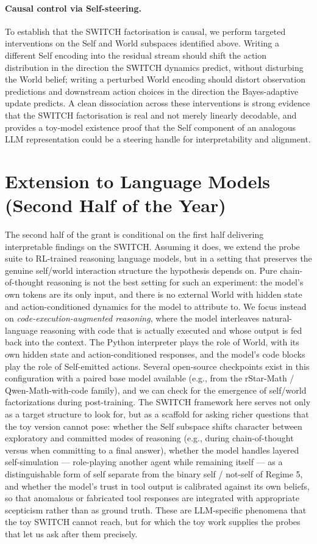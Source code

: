 \documentclass[11pt]{article}
\begin{document}
\paragraph{Causal control via Self-steering.} To establish that the SWITCH factorisation is causal, we perform targeted interventions on the Self and World subspaces identified above. Writing a different Self encoding into the residual stream should shift the action distribution in the direction the SWITCH dynamics predict, without disturbing the World belief; writing a perturbed World encoding should distort observation predictions and downstream action choices in the direction the Bayes-adaptive update predicts. A clean dissociation across these interventions is strong evidence that the SWITCH factorisation is real and not merely linearly decodable, and provides a toy-model existence proof that the Self component of an analogous LLM representation could be a steering handle for interpretability and alignment.

\section*{Extension to Language Models (Second Half of the Year)}

The second half of the grant is conditional on the first half delivering interpretable findings on the SWITCH. Assuming it does, we extend the probe suite to RL-trained reasoning language models, but in a setting that preserves the genuine self/world interaction structure the hypothesis depends on. Pure chain-of-thought reasoning is not the best setting for such an experiment: the model's own tokens are its only input, and there is no external World with hidden state and action-conditioned dynamics for the model to attribute to. We focus instead on \emph{code-execution-augmented reasoning}, where the model interleaves natural-language reasoning with code that is actually executed and whose output is fed back into the context. The Python interpreter plays the role of World, with its own hidden state and action-conditioned responses, and the model's code blocks play the role of Self-emitted actions. Several open-source checkpoints exist in this configuration with a paired base model available (e.g., from the rStar-Math / Qwen-Math-with-code family), and we can check for the emergence of self/world factorizations during post-training. The SWITCH framework here serves not only as a target structure to look for, but as a scaffold for asking richer questions that the toy version cannot pose: whether the Self subspace shifts character between exploratory and committed modes of reasoning (e.g., during chain-of-thought versus when committing to a final answer), whether the model handles layered self-simulation --- role-playing another agent while remaining itself --- as a distinguishable form of self separate from the binary self / not-self of Regime 5, and whether the model's trust in tool output is calibrated against its own beliefs, so that anomalous or fabricated tool responses are integrated with appropriate scepticism rather than as ground truth. These are LLM-specific phenomena that the toy SWITCH cannot reach, but for which the toy work supplies the probes that let us ask after them precisely.
\end{document}
